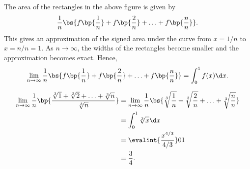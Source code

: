\begin{solution}
\begin{ppart}
\begin{center}
        \end{center}

        The area of the rectangles in the above figure is given by \[\frac1n \bs{f\bp{\frac1n} + f\bp{\frac2n} + \ldots + f\bp{\frac{n}{n}}}.\] This gives an approximation of the signed area under the curve from $x = 1/n$ to $x = n/n = 1$. As $n \to \infty$, the widths of the rectangles become smaller and the approximation becomes exact. Hence, \[\lim_{n \to \infty} \frac1n \bs{f\bp{\frac1n} + f\bp{\frac2n} + \ldots + f\bp{\frac{n}{n}}} = \int_0^1 f(x) \d x.\]
    \end{ppart}
    \begin{ppart}
        \begin{align*}
            \lim_{n \to \infty} \frac1n \bp{\frac{\sqrt[3]1 + \sqrt[3]2 + \ldots + \sqrt[3]n}{\sqrt[3]n}} &= \lim_{n \to \infty} \frac1n \bs{\sqrt[3]{\frac1n} + \sqrt[3]{\frac2n} + \ldots + \sqrt[3]{\frac{n}{n}}}\\
            &= \int_0^1 \sqrt[3]{x} \d x\\
            &= \evalint{\frac{x^{4/3}}{4/3}}01\\
            &= \frac34.
        \end{align*}
    \end{ppart}
\end{solution}

